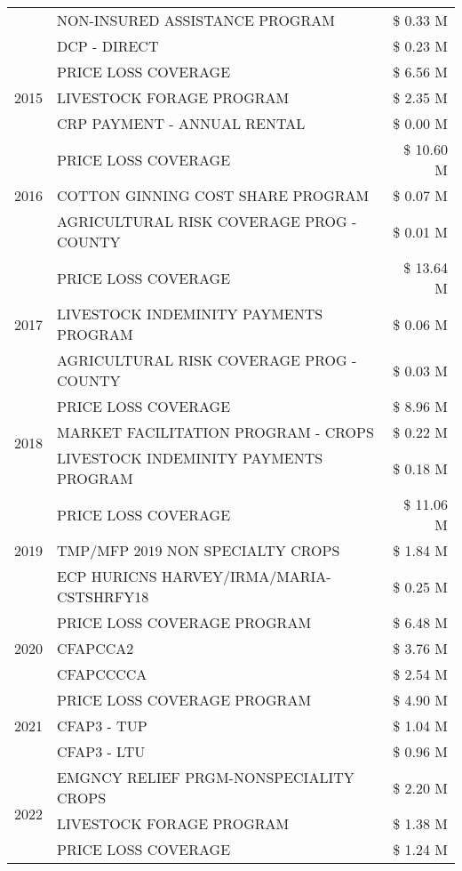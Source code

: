 \begin{tabular}{llr}
 & NON-INSURED ASSISTANCE PROGRAM & \$ 0.33 M \\
 & DCP - DIRECT & \$ 0.23 M \\
\cline{1-3}
\multirow[t]{3}{*}{2015} & PRICE LOSS COVERAGE & \$ 6.56 M \\
 & LIVESTOCK FORAGE PROGRAM & \$ 2.35 M \\
 & CRP PAYMENT - ANNUAL RENTAL & \$ 0.00 M \\
\cline{1-3}
\multirow[t]{3}{*}{2016} & PRICE LOSS COVERAGE & \$ 10.60 M \\
 & COTTON GINNING COST SHARE PROGRAM & \$ 0.07 M \\
 & AGRICULTURAL RISK COVERAGE PROG - COUNTY & \$ 0.01 M \\
\cline{1-3}
\multirow[t]{3}{*}{2017} & PRICE LOSS COVERAGE & \$ 13.64 M \\
 & LIVESTOCK INDEMINITY PAYMENTS PROGRAM & \$ 0.06 M \\
 & AGRICULTURAL RISK COVERAGE PROG - COUNTY & \$ 0.03 M \\
\cline{1-3}
\multirow[t]{3}{*}{2018} & PRICE LOSS COVERAGE & \$ 8.96 M \\
 & MARKET FACILITATION PROGRAM - CROPS & \$ 0.22 M \\
 & LIVESTOCK INDEMINITY PAYMENTS PROGRAM & \$ 0.18 M \\
\cline{1-3}
\multirow[t]{3}{*}{2019} & PRICE LOSS COVERAGE & \$ 11.06 M \\
 & TMP/MFP 2019 NON SPECIALTY CROPS & \$ 1.84 M \\
 & ECP HURICNS HARVEY/IRMA/MARIA-CSTSHRFY18 & \$ 0.25 M \\
\cline{1-3}
\multirow[t]{3}{*}{2020} & PRICE LOSS COVERAGE PROGRAM & \$ 6.48 M \\
 & CFAPCCA2 & \$ 3.76 M \\
 & CFAPCCCCA & \$ 2.54 M \\
\cline{1-3}
\multirow[t]{3}{*}{2021} & PRICE LOSS COVERAGE PROGRAM & \$ 4.90 M \\
 & CFAP3 - TUP & \$ 1.04 M \\
 & CFAP3 - LTU & \$ 0.96 M \\
\cline{1-3}
\multirow[t]{3}{*}{2022} & EMGNCY RELIEF PRGM-NONSPECIALITY CROPS & \$ 2.20 M \\
 & LIVESTOCK FORAGE PROGRAM & \$ 1.38 M \\
 & PRICE LOSS COVERAGE & \$ 1.24 M \\
\cline{1-3}
\bottomrule
\end{tabular}
